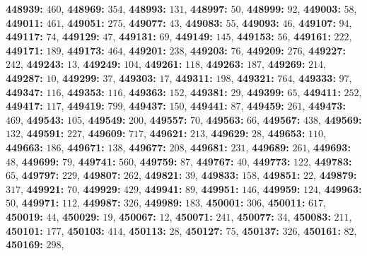 \textsf{\bfseries 448939:} $460$, \textsf{\bfseries 448969:} $354$, \textsf{\bfseries 448993:} $131$, \textsf{\bfseries 448997:} $50$, \textsf{\bfseries 448999:} $92$, \textsf{\bfseries 449003:} $58$, \textsf{\bfseries 449011:} $461$, \textsf{\bfseries 449051:} $275$, \textsf{\bfseries 449077:} $43$, \textsf{\bfseries 449083:} $55$, \textsf{\bfseries 449093:} $46$, \textsf{\bfseries 449107:} $94$, \textsf{\bfseries 449117:} $74$, \textsf{\bfseries 449129:} $47$, \textsf{\bfseries 449131:} $69$, \textsf{\bfseries 449149:} $145$, \textsf{\bfseries 449153:} $56$, \textsf{\bfseries 449161:} $222$, \textsf{\bfseries 449171:} $189$, \textsf{\bfseries 449173:} $464$, \textsf{\bfseries 449201:} $238$, \textsf{\bfseries 449203:} $76$, \textsf{\bfseries 449209:} $276$, \textsf{\bfseries 449227:} $242$, \textsf{\bfseries 449243:} $13$, \textsf{\bfseries 449249:} $104$, \textsf{\bfseries 449261:} $118$, \textsf{\bfseries 449263:} $187$, \textsf{\bfseries 449269:} $214$, \textsf{\bfseries 449287:} $10$, \textsf{\bfseries 449299:} $37$, \textsf{\bfseries 449303:} $17$, \textsf{\bfseries 449311:} $198$, \textsf{\bfseries 449321:} $764$, \textsf{\bfseries 449333:} $97$, \textsf{\bfseries 449347:} $116$, \textsf{\bfseries 449353:} $116$, \textsf{\bfseries 449363:} $152$, \textsf{\bfseries 449381:} $29$, \textsf{\bfseries 449399:} $65$, \textsf{\bfseries 449411:} $252$, \textsf{\bfseries 449417:} $117$, \textsf{\bfseries 449419:} $799$, \textsf{\bfseries 449437:} $150$, \textsf{\bfseries 449441:} $87$, \textsf{\bfseries 449459:} $261$, \textsf{\bfseries 449473:} $469$, \textsf{\bfseries 449543:} $105$, \textsf{\bfseries 449549:} $200$, \textsf{\bfseries 449557:} $70$, \textsf{\bfseries 449563:} $66$, \textsf{\bfseries 449567:} $438$, \textsf{\bfseries 449569:} $132$, \textsf{\bfseries 449591:} $227$, \textsf{\bfseries 449609:} $717$, \textsf{\bfseries 449621:} $213$, \textsf{\bfseries 449629:} $28$, \textsf{\bfseries 449653:} $110$, \textsf{\bfseries 449663:} $186$, \textsf{\bfseries 449671:} $138$, \textsf{\bfseries 449677:} $208$, \textsf{\bfseries 449681:} $231$, \textsf{\bfseries 449689:} $261$, \textsf{\bfseries 449693:} $48$, \textsf{\bfseries 449699:} $79$, \textsf{\bfseries 449741:} $560$, \textsf{\bfseries 449759:} $87$, \textsf{\bfseries 449767:} $40$, \textsf{\bfseries 449773:} $122$, \textsf{\bfseries 449783:} $65$, \textsf{\bfseries 449797:} $229$, \textsf{\bfseries 449807:} $262$, \textsf{\bfseries 449821:} $39$, \textsf{\bfseries 449833:} $158$, \textsf{\bfseries 449851:} $22$, \textsf{\bfseries 449879:} $317$, \textsf{\bfseries 449921:} $70$, \textsf{\bfseries 449929:} $429$, \textsf{\bfseries 449941:} $89$, \textsf{\bfseries 449951:} $146$, \textsf{\bfseries 449959:} $124$, \textsf{\bfseries 449963:} $50$, \textsf{\bfseries 449971:} $112$, \textsf{\bfseries 449987:} $326$, \textsf{\bfseries 449989:} $183$, \textsf{\bfseries 450001:} $306$, \textsf{\bfseries 450011:} $617$, \textsf{\bfseries 450019:} $44$, \textsf{\bfseries 450029:} $19$, \textsf{\bfseries 450067:} $12$, \textsf{\bfseries 450071:} $241$, \textsf{\bfseries 450077:} $34$, \textsf{\bfseries 450083:} $211$, \textsf{\bfseries 450101:} $177$, \textsf{\bfseries 450103:} $414$, \textsf{\bfseries 450113:} $28$, \textsf{\bfseries 450127:} $75$, \textsf{\bfseries 450137:} $326$, \textsf{\bfseries 450161:} $82$, \textsf{\bfseries 450169:} $298$, 
